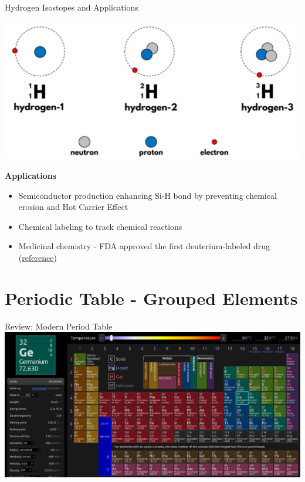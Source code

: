 \documentclass[11pt]{beamer}
\begin{document}
\begin{frame}{Hydrogen Isostopes and Applications}
  \begin{center}
    \includegraphics[width=0.75\linewidth]{hydro_iso}
  \end{center}

  \textbf{Applications}
  
  \begin{itemize}
  \item Semiconductor production enhancing Si-H bond by preventing
    chemical erosion and Hot Carrier Effect
  \item Chemical labeling to track chemical reactions
  \item Medicinal chemistry - FDA approved the first deuterium-labeled
    drug (\href{https://pubs.acs.org/doi/10.1021/acs.jmedchem.8b01808}{reference})
  \end{itemize}
\end{frame}

\section{Periodic Table - Grouped Elements}

\begin{frame}{Review: Modern Period Table}
  \centering
  \includegraphics[width=\linewidth]{ptable}
\end{frame}
\end{document}
